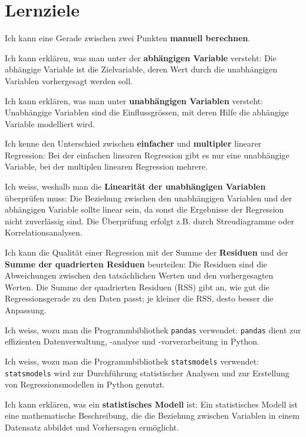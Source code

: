 \section{Lernziele}
\begin{todolist}
	\item Ich kann eine Gerade zwischen zwei Punkten \textbf{manuell berechnen}.
	\item Ich kann erklären, was man unter der \textbf{abhängigen Variable} versteht: Die abhängige Variable ist die Zielvariable, deren Wert durch die unabhängigen Variablen vorhergesagt werden soll.
	\item Ich kann erklären, was man unter \textbf{unabhängigen Variablen} versteht: Unabhängige Variablen sind die Einflussgrössen, mit deren Hilfe die abhängige Variable modelliert wird.
	\item Ich kenne den Unterschied zwischen \textbf{einfacher} und \textbf{multipler} linearer Regression: Bei der einfachen linearen Regression gibt es nur eine unabhängige Variable, bei der multiplen linearen Regression mehrere.
	\item Ich weiss, weshalb man die \textbf{Linearität der unabhängigen Variablen} überprüfen muss: Die Beziehung zwischen den unabhängigen Variablen und der abhängigen Variable sollte linear sein, da sonst die Ergebnisse der Regression nicht zuverlässig sind. Die Überprüfung erfolgt z.B. durch Streudiagramme oder Korrelationsanalysen.
	\item Ich kann die Qualität einer Regression mit der Summe der \textbf{Residuen} und der \textbf{Summe der quadrierten Residuen} beurteilen: Die Residuen sind die Abweichungen zwischen den tatsächlichen Werten und den vorhergesagten Werten. Die Summe der quadrierten Residuen (RSS) gibt an, wie gut die Regressionsgerade zu den Daten passt; je kleiner die RSS, desto besser die Anpassung.
	\item Ich weiss, wozu man die Programmbibliothek \texttt{pandas} verwendet: \texttt{pandas} dient zur effizienten Datenverwaltung, -analyse und -vorverarbeitung in Python.
	\item Ich weiss, wozu man die Programmbibliothek \texttt{statsmodels} verwendet: \texttt{statsmodels} wird zur Durchführung statistischer Analysen und zur Erstellung von Regressionsmodellen in Python genutzt.
	\item Ich kann erklären, was ein \textbf{statistisches Modell} ist: Ein statistisches Modell ist eine mathematische Beschreibung, die die Beziehung zwischen Variablen in einem Datensatz abbildet und Vorhersagen ermöglicht.
\end{todolist}
